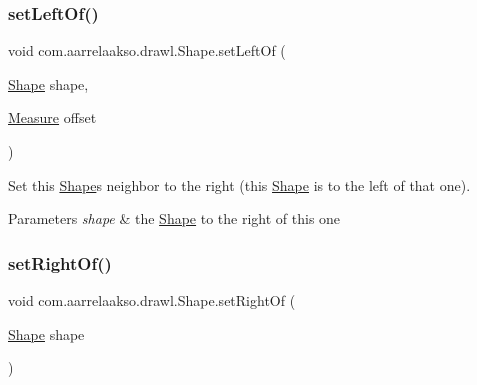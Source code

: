 \mbox{\label{classcom_1_1aarrelaakso_1_1drawl_1_1_shape_aa1f77ee3e24986329b3618b76b2d12be}} 
\subsubsection{\texorpdfstring{set\+Left\+Of()}{setLeftOf()}\hspace{0.1cm}{\footnotesize\ttfamily [2/2]}}
{\footnotesize\ttfamily void com.\+aarrelaakso.\+drawl.\+Shape.\+set\+Left\+Of (\begin{DoxyParamCaption}\item[{\hyperlink{classcom_1_1aarrelaakso_1_1drawl_1_1_shape}{Shape}}]{shape,  }\item[{\hyperlink{classcom_1_1aarrelaakso_1_1drawl_1_1_measure}{Measure}}]{offset }\end{DoxyParamCaption})\hspace{0.3cm}{\ttfamily [inherited]}}



Set this \hyperlink{classcom_1_1aarrelaakso_1_1drawl_1_1_shape}{Shape}\textquotesingle{}s neighbor to the right (this \hyperlink{classcom_1_1aarrelaakso_1_1drawl_1_1_shape}{Shape} is to the left of that one). 


\begin{DoxyParams}{Parameters}
{\em shape} & the \hyperlink{classcom_1_1aarrelaakso_1_1drawl_1_1_shape}{Shape} to the right of this one \\
\hline
\end{DoxyParams}
\mbox{\label{classcom_1_1aarrelaakso_1_1drawl_1_1_shape_a09e1586ce85c1d964cc3b7ce94bc5d4c}} 
\subsubsection{\texorpdfstring{set\+Right\+Of()}{setRightOf()}\hspace{0.1cm}{\footnotesize\ttfamily [1/2]}}
{\footnotesize\ttfamily void com.\+aarrelaakso.\+drawl.\+Shape.\+set\+Right\+Of (\begin{DoxyParamCaption}\item[{\hyperlink{classcom_1_1aarrelaakso_1_1drawl_1_1_shape}{Shape}}]{shape }\end{DoxyParamCaption})\hspace{0.3cm}{\ttfamily [inherited]}}



